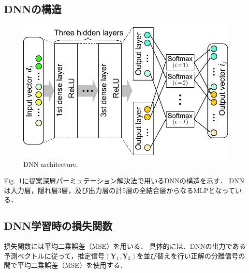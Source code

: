 \documentclass[a4j]{jsarticle}
\begin{document}
\subsection{DNNの構造}
\begin{figure}[t]
  \begin{center}
      \includegraphics[width=0.8\columnwidth]{figures/architecture_DNN.pdf}
  \end{center}
  \vspace{-8pt}
\caption{DNN architecture.}
\label{fig:Dnnmodel}
\end{figure}
Fig.~\ref{fig:Dnnmodel}に提案深層パーミュテーション解決法で用いるDNNの構造を示す．
DNNは入力層，隠れ層3層，及び出力層の計5層の全結合層からなるMLPとなっている．

\subsection{DNN学習時の損失関数}
損失関数には平均二乗誤差（MSE）を用いる．
具体的には．DNNの出力である予測ベクトルに従って，推定信号$(\bm{Y}_1, \bm{Y}_2)$を並び替えを行い正解の分離信号の間で平均二乗誤差（MSE）を使用する．
\end{document}

